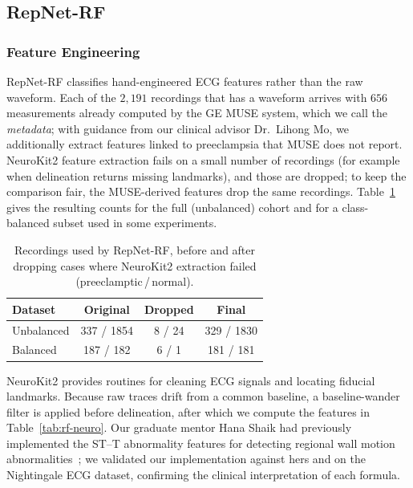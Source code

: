 \documentclass[sigconf,nonacm]{acmart}
\begin{document}
\subsection{RepNet-RF}
\label{sec:rf}

\subsubsection{Feature Engineering}

RepNet-RF classifies hand-engineered ECG features rather than the raw
waveform. Each of the $2{,}191$ recordings that has a waveform arrives with
$656$ measurements already computed by the GE MUSE system, which we call the
\emph{metadata}; with guidance from our clinical advisor Dr.~Lihong Mo, we
additionally extract features linked to preeclampsia that MUSE does not
report. NeuroKit2 feature extraction fails on a small number of recordings
(for example when delineation returns missing landmarks), and those are
dropped; to keep the comparison fair, the MUSE-derived features drop the same
recordings. Table~\ref{tab:rf-cohort} gives the resulting counts for the full
(unbalanced) cohort and for a class-balanced subset used in some experiments.

\begin{table}[H]
\centering
\caption{Recordings used by RepNet-RF, before and after dropping cases where
NeuroKit2 extraction failed (preeclamptic\,/\,normal).}
\label{tab:rf-cohort}
\small
\begin{tabular}{@{}lccc@{}}
\toprule
\textbf{Dataset} & \textbf{Original} & \textbf{Dropped} & \textbf{Final} \\
\midrule
Unbalanced & 337 / 1854 & 8 / 24 & 329 / 1830 \\
Balanced   & 187 / 182  & 6 / 1  & 181 / 181  \\
\bottomrule
\end{tabular}
\end{table}

NeuroKit2 provides routines for cleaning ECG signals and locating fiducial
landmarks. Because raw traces drift from a common baseline, a baseline-wander
filter is applied before delineation, after which we compute the features in
Table~\ref{tab:rf-neuro}. Our graduate mentor Hana Shaik had previously
implemented the ST--T abnormality features for detecting regional wall motion
abnormalities~\cite{joshi_linking_2025}; we validated our implementation
against hers and on the Nightingale ECG dataset, confirming the clinical
interpretation of each formula.
\end{document}
